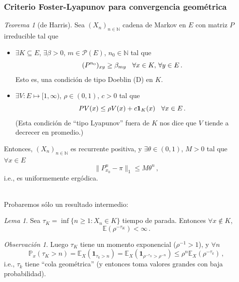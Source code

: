 \documentclass[letterpaper,11pt]{article} %
\def\espacio{\hspace{.25cm}\,}
\theoremstyle{defbreak}
\theoremstyle{propbreak}
\theoremstyle{remark}
\newtheorem{remark}{Observación}[subsection]
\theoremstyle{break}
\newtheorem{theorem}{Teorema}[subsection]
\newtheorem{lemma}{Lema}[subsection]
\def\E{\mathbb{E}}
\def\P{\mathbb{P}}
\def\N{\mathbb{N}}
\begin{document}
\subsubsection{Criterio Foster-Lyapunov para convergencia geométrica}
\begin{theorem}[de Harris]
Sea $(X_n)_{n\in\N}$ cadena de Markov en $E$ con matriz $P$ irreducible tal que
\begin{itemize}
    \item $\exists K\subseteq E$, $\exists\beta>0$, $m\in\mathcal{P}(E)$, $n_0\in\N$ tal que
    $$ (P^{n_0})_{xy}\geq\beta_{my}\espacio\forall x\in K,\,\forall y\in E \, .$$
    Esto es, una condición de tipo Doeblin (D) en $K$.
    \item $\exists V:E\longmapsto [1,\infty)$, $\rho\in(0,1)$, $c>0$ tal que
    $$ PV(x)\leq\rho V(x)+c\mathbf{1}_K(x) \espacio\forall x\in E \,.$$
    (Esta condición de ``tipo Lyapunov'' fuera de $K$ nos dice que $V$ tiende a decrecer en promedio.)
\end{itemize}
Entonces, $(X_n)_{n\in\N}$ es recurrente positiva, y $\exists\theta\in(0,1)$, $M>0$ tal que $\forall x\in E$
$$ \|P^n_{x_0}-\pi\|_1\leq M\theta^n \, ,$$
i.e., es uniformemente ergódica.
\end{theorem}
\vspace{.5cm}\\
Probaremos sólo un resultado intermedio:
\begin{lemma}
Sea $\tau_K=\inf\{n\geq1:X_n\in K\}$ tiempo de parada. Entonces $\forall x\notin K$,
$$ \E(\rho^{-\tau_K})<\infty \, .$$
\end{lemma}
\begin{remark}
Luego $\tau_K$ tiene un momento exponencial ($\rho^{-1}>1$), y $\forall n$
$$ \P_x(\tau_K>n)=\E_X(\mathbf{1}_{\tau_k>n})=\E_X(\mathbf{1}_{\rho^{-\tau_X}>\rho^{-n}})\leq\rho^n\E_X(\rho^{-\tau_k}) \, ,$$
i.e., $\tau_k$ tiene ``cola geométrica'' (y entonces toma valores grandes con baja probabilidad).
\end{remark}
\end{document}
